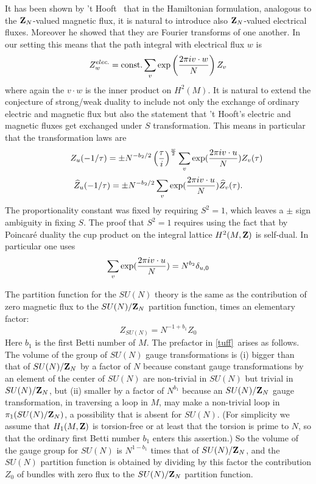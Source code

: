 \documentclass[12pt]{article}
\numberwithin{equation}{section}
\begin{document}
It has been shown by
't Hooft \cite{thooft}\ that
in the Hamiltonian formulation,
analogous to the ${\bf Z}_N$-valued magnetic flux,
it is natural to introduce also
${\bf Z}_N$-valued electrical
fluxes.  Moreover he showed that they are Fourier transforms
of one another.  In our setting this means that
the path integral with electrical flux $w$ is
%
$$Z^{elec.}_w={\rm const.}
\sum_{v} {\rm exp}\left({2 \pi i v\cdot w\over N}\right)Z_v$$
%
where again the $v\cdot w$ is the inner product on $H^2(M)$.
It is natural to extend the conjecture of strong/weak duality
to include not only
the exchange of ordinary
electric and magnetic flux but
also the statement that 't Hooft's electric and
magnetic fluxes get exchanged under $S$ transformation.  This means in
particular that the transformation laws are
%
$$\qquad Z_u(-1/\tau)= \pm N^{-b_2/2}
\left({\tau \over i }\right)^{w\over 2}
\sum_{v} {\rm exp}({2 \pi i v\cdot u\over N})Z_v(\tau)$$
\begin{equation}
  \label{stran}
  {\hat Z_u}(-1/\tau)=\pm N^{-b_2/2} \sum_{v} {\rm exp}({2 \pi i
  v\cdot u\over N})\hat Z_v(\tau).
\end{equation}
%
The proportionality constant was fixed by requiring $S^2=1$,
which leaves a $\pm$ sign ambiguity in fixing $S$.  The proof that $S^2=1$
requires using the fact that by Poincar\'e duality the cup
product on the integral lattice $H^2(M,{\bf Z})$ is
self-dual.  In particular one uses
%
\begin{equation}
  \label{useq}
  \sum_{v} {\rm exp}({2\pi i v\cdot u\over N})=N^{b_2}\delta_{u,0}
\end{equation}
%

The partition function for the
$SU(N)$ theory is the same as the contribution of zero magnetic
flux to the $SU(N)/{\bf Z}_N$ partition function, times an elementary factor:
%
\begin{equation}
  \label{tuff}
  Z_{SU(N)}= N^{-1+b_1}Z_0
\end{equation}
%
Here $b_1$ is the first Betti number of $M$. The prefactor  in \eqref{tuff}\
arises
as follows.  The volume of the group of $SU(N)$ gauge transformations
is (i) bigger than that of $SU(N)/{\bf Z}_N$ by a factor of $N$ because
constant gauge transformations by an element of the center of $SU(N)$
are non-trivial in $SU(N)$ but trivial in $SU(N)/{\bf Z}_N$, but (ii)
smaller by a factor of $N^{b_1}$ because an $SU(N)/{\bf Z}_N$
gauge transformation, in traversing a loop in $M$, may make a non-trivial
loop in $\pi_1(SU(N)/{\bf Z}_N)$, a  possibility that is absent for $SU(N)$.
(For simplicity we assume that $H_1(M,{\bf Z})$ is torsion-free or
  at least that the torsion is prime to $N$, so that the ordinary first
Betti number $b_1$ enters this assertion.)  So the volume of the gauge
group for $SU(N)$ is $N^{1-b_1}$ times that of $SU(N)/{\bf Z}_N$,
and the $SU(N)$ partition function is obtained by dividing by this
factor the contribution $Z_0$ of bundles with zero flux to the
$SU(N)/{\bf Z}_N$ partition function.
\end{document}

